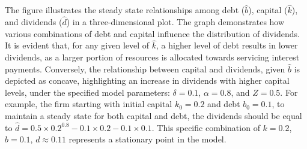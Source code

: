 \documentclass[12pt]{report}
\begin{document}
The figure illustrates the steady state relationships among debt (\(\widehat{b}\)), capital (\(\widehat{k}\)), and
dividends  (\(\widehat{d}\)) in a three-dimensional plot. The graph demonstrates how various combinations of debt and
capital influence the distribution of dividends. It is evident that, for any given level of \(\hat{k}\), a higher level of debt results in lower
dividends, as a larger portion of resources is allocated towards servicing interest payments. Conversely, the
relationship between capital and dividends, given \(\hat{b}\) is depicted as concave, highlighting an increase in dividends with higher
capital levels, under the specified model parameters: \(\delta = 0.1\), \(\alpha = 0.8\), and \(Z = 0.5\).
For example, the firm starting with initial capital \(k_0 = 0.2\) and debt \(b_0 = 0.1\), to maintain a steady state for both
capital and  debt, the dividends should be equal to \(\widehat{d} = 0.5 \times 0.2^{0.8} - 0.1 \times 0.2 - 0.1
\times 0.1\). This specific combination of \(k= 0.2\), \(b = 0.1\), \(d \approx 0.11 \) represents a stationary point in the model.
\vspace{1cm}
\end{document}
